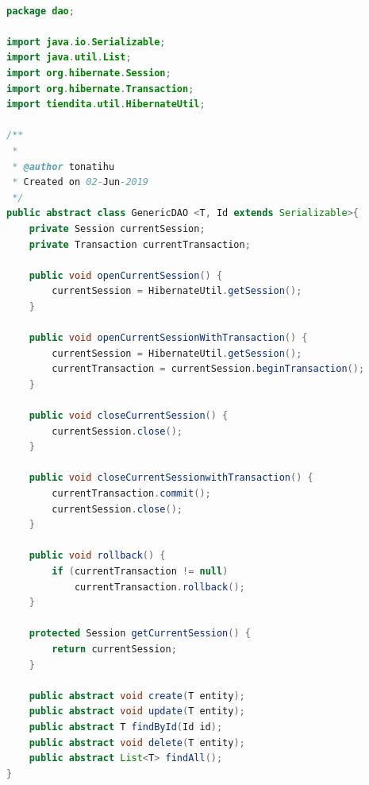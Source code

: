 \documentclass[a4paper,12pt]{article}
\begin{document}
\begin{lstlisting}[language=Java, style=customJava, 
caption={GenericDAO.java}, captionpos=b,basicstyle=\fontfamily{cmss}\small]

package dao;

import java.io.Serializable;
import java.util.List;
import org.hibernate.Session;
import org.hibernate.Transaction;
import tiendita.util.HibernateUtil;

/**
 *
 * @author tonatihu
 * Created on 02-Jun-2019
 */
public abstract class GenericDAO <T, Id extends Serializable>{
    private Session currentSession;
    private Transaction currentTransaction;

    public void openCurrentSession() {
        currentSession = HibernateUtil.getSession();
    }

    public void openCurrentSessionWithTransaction() {
        currentSession = HibernateUtil.getSession();
        currentTransaction = currentSession.beginTransaction();
    }

    public void closeCurrentSession() {
        currentSession.close();
    }

    public void closeCurrentSessionwithTransaction() {
        currentTransaction.commit();
        currentSession.close();
    }

    public void rollback() {
        if (currentTransaction != null)
            currentTransaction.rollback();
    }

    protected Session getCurrentSession() {
        return currentSession;
    }

    public abstract void create(T entity);
    public abstract void update(T entity);
    public abstract T findById(Id id);
    public abstract void delete(T entity);
    public abstract List<T> findAll();
}


\end{lstlisting}
\end{document}
